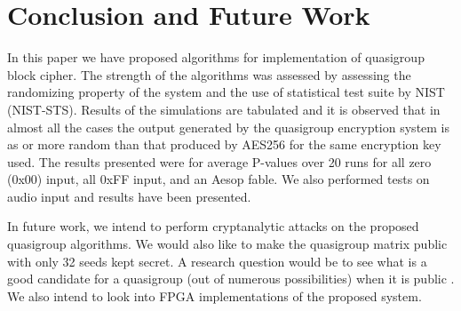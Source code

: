 \documentclass[conference]{IEEEtran}
\begin{document}
\section{Conclusion and Future Work}
In this paper we have proposed algorithms for implementation of quasigroup block cipher. The strength of the algorithms was assessed by assessing the randomizing property of the system and the use of statistical test suite by NIST (NIST-STS). Results of the simulations are tabulated and it is observed that in almost all the cases the output generated by the quasigroup encryption system is as or more random than that produced by AES256 for the same encryption key used. The results presented were for average P-values over 20 runs for all zero (0x00) input, all 0xFF input, and an Aesop fable. We also performed tests on audio input and results have been presented.

In future work, we intend to perform cryptanalytic attacks on the proposed quasigroup algorithms. We would also like to make the quasigroup matrix public with only 32 seeds kept secret. A research question would be to see what is a good candidate for a quasigroup (out of numerous possibilities) when it is public \cite{Dvorsky}. We also intend to look into FPGA implementations of the proposed system.




\end{document}
